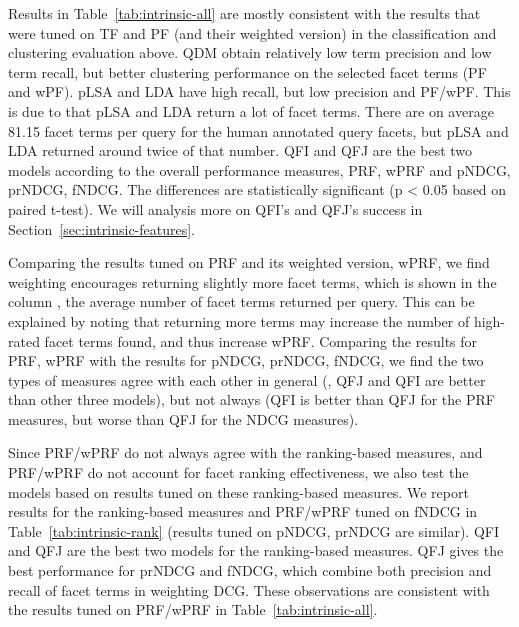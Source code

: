 Results in Table~\ref{tab:intrinsic-all} are mostly consistent with the results that were tuned on TF and PF (and their weighted version) in the classification and clustering evaluation above. QDM obtain relatively low term precision and low term recall, but better clustering performance on the selected facet terms (PF and wPF). pLSA and LDA have high recall, but low precision and PF/wPF. This is due to that pLSA and LDA return a lot of facet terms. There are on average 81.15 facet terms per query for the human annotated query facets, but pLSA and LDA returned around twice of that number. QFI and QFJ are the best two models according to the overall performance measures, PRF, wPRF and pNDCG, prNDCG, fNDCG. The differences are statistically significant (p < 0.05 based on paired t-test). We will analysis more on QFI's and QFJ's success in Section~\ref{sec:intrinsic-features}.

Comparing the results tuned on PRF and its weighted version, wPRF, we find weighting encourages returning slightly more facet terms, which is shown in the column , the average number of facet terms returned per query. This can be explained by noting that returning more terms may increase the number of high-rated facet terms found, and thus increase wPRF. Comparing the results for PRF, wPRF with the results for pNDCG, prNDCG, fNDCG, we find the two types of measures agree with each other in general (\eg, QFJ and QFI are better than other three models), but not always (QFI is better than QFJ for the PRF measures, but worse than QFJ for the NDCG measures). 


Since PRF/wPRF do not always agree with the ranking-based measures, and PRF/wPRF do not account for facet ranking effectiveness, we also test the models based on results tuned on these ranking-based measures. We report results for the ranking-based measures and PRF/wPRF tuned on fNDCG in Table~\ref{tab:intrinsic-rank} (results tuned on pNDCG, prNDCG are similar). 
QFI and QFJ are the best two models for the ranking-based measures. QFJ gives the best performance for prNDCG and fNDCG, which combine both precision and recall of facet terms in weighting DCG. These observations are consistent with the results tuned on PRF/wPRF in Table~\ref{tab:intrinsic-all}. 

